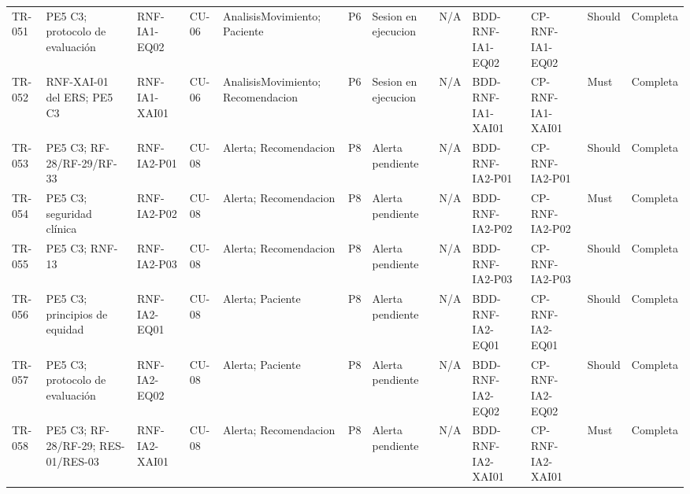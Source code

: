 \documentclass[12pt,a4paper]{article}
\begin{document}
\begin{landscape}
\begin{longtable}{p{0.9cm}p{2.5cm}p{1.7cm}p{1.8cm}p{3.6cm}p{1.6cm}p{3.0cm}p{1.6cm}p{1.8cm}p{1.8cm}p{1.4cm}p{1.5cm}}
TR-051 & PE5 C3; protocolo de evaluación & RNF-IA1-EQ02 & CU-06 & AnalisisMovimiento; Paciente & P6 & Sesion en ejecucion & N/A & BDD-RNF-IA1-EQ02 & CP-RNF-IA1-EQ02 & Should & Completa \\
TR-052 & RNF-XAI-01 del ERS; PE5 C3 & RNF-IA1-XAI01 & CU-06 & AnalisisMovimiento; Recomendacion & P6 & Sesion en ejecucion & N/A & BDD-RNF-IA1-XAI01 & CP-RNF-IA1-XAI01 & Must & Completa \\
TR-053 & PE5 C3; RF-28/RF-29/RF-33 & RNF-IA2-P01 & CU-08 & Alerta; Recomendacion & P8 & Alerta pendiente & N/A & BDD-RNF-IA2-P01 & CP-RNF-IA2-P01 & Should & Completa \\
TR-054 & PE5 C3; seguridad clínica & RNF-IA2-P02 & CU-08 & Alerta; Recomendacion & P8 & Alerta pendiente & N/A & BDD-RNF-IA2-P02 & CP-RNF-IA2-P02 & Must & Completa \\
TR-055 & PE5 C3; RNF-13 & RNF-IA2-P03 & CU-08 & Alerta; Recomendacion & P8 & Alerta pendiente & N/A & BDD-RNF-IA2-P03 & CP-RNF-IA2-P03 & Should & Completa \\
TR-056 & PE5 C3; principios de equidad & RNF-IA2-EQ01 & CU-08 & Alerta; Paciente & P8 & Alerta pendiente & N/A & BDD-RNF-IA2-EQ01 & CP-RNF-IA2-EQ01 & Should & Completa \\
TR-057 & PE5 C3; protocolo de evaluación & RNF-IA2-EQ02 & CU-08 & Alerta; Paciente & P8 & Alerta pendiente & N/A & BDD-RNF-IA2-EQ02 & CP-RNF-IA2-EQ02 & Should & Completa \\
TR-058 & PE5 C3; RF-28/RF-29; RES-01/RES-03 & RNF-IA2-XAI01 & CU-08 & Alerta; Recomendacion & P8 & Alerta pendiente & N/A & BDD-RNF-IA2-XAI01 & CP-RNF-IA2-XAI01 & Must & Completa \\
\bottomrule\end{longtable}
\end{landscape}
\normalsize\clearpage
\end{document}
